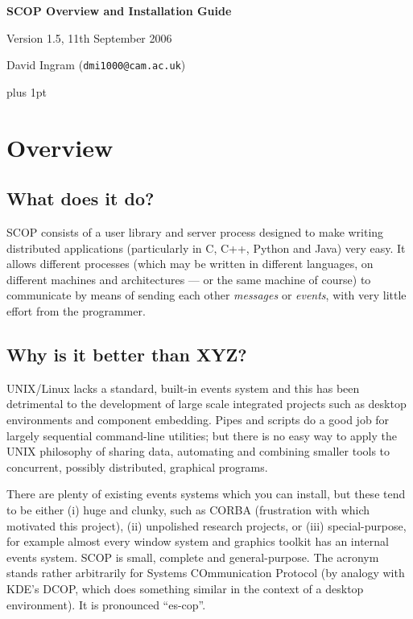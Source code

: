 \documentclass[12pt,a4paper,twoside]{article}
\renewcommand{\_}{\texttt{\symbol{95}}}
\begin{document}
\centerline{\textbf{\LARGE SCOP Overview and Installation Guide}}
\vspace{0.5cm}
\centerline{Version 1.5, 11th September 2006}
\centerline{David Ingram (\texttt{dmi1000@cam.ac.uk})}

{ \parskip 1mm plus 1pt \tableofcontents }

\section{Overview}

\subsection{What does it do?}

SCOP consists of a user library and server process designed to make
writing distributed applications (particularly in C, C++, Python and
Java) very easy. It allows different processes (which may be written in
different languages, on different machines and architectures --- or the
same machine of course) to communicate by means of sending each other
\textit{messages} or \textit{events}, with very little effort from the
programmer.

\subsection{Why is it better than XYZ?}

UNIX/Linux lacks a standard, built-in events system and this has been
detrimental to the development of large scale integrated projects such
as desktop environments and component embedding. Pipes and scripts do a
good job for largely sequential command-line utilities; but there is no
easy way to apply the UNIX philosophy of sharing data, automating and
combining smaller tools to concurrent, possibly distributed, graphical
programs.

There are plenty of existing events systems which you can install, but
these tend to be either (i) huge and clunky, such as CORBA (frustration
with which motivated this project), (ii) unpolished research projects,
or (iii) special-purpose, for example almost every window system and
graphics toolkit has an internal events system. SCOP is small, complete
and general-purpose. The acronym stands rather arbitrarily for Systems
COmmunication Protocol (by analogy with KDE's DCOP, which does
something similar in the context of a desktop environment). It is
pronounced ``es-cop''.
\end{document}
